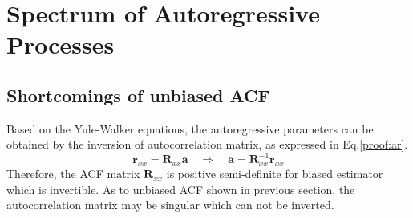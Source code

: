 \section{Spectrum of Autoregressive Processes}
\subsection{Shortcomings of unbiased ACF}
Based on the Yule-Walker equations, the autoregressive parameters can be obtained by the inversion of autocorrelation matrix, as expressed in Eq.\ref{proof:ar}.
\begin{equation}
\mathbf{r}_{xx}=\mathbf R_{xx}\mathbf a \quad \Rightarrow \quad \mathbf a=\mathbf R^{-1}_{xx}\mathbf {r}_{xx}
\label{proof:ar}
\end{equation}
Therefore, the ACF matrix $\mathbf {R}_{xx}$ is positive semi-definite for biased estimator which is invertible. As to unbiased ACF shown in previous section, the autocorrelation matrix may be singular which can not be inverted.
